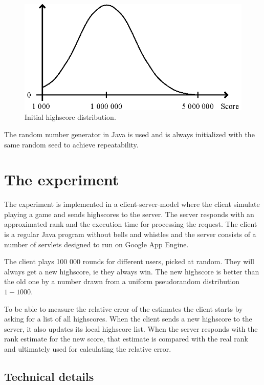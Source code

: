 \begin{figure}[h]
  \centering
  \caption{Initial highscore distribution.}
  \label{fig:highscore-distribution}
  \includegraphics[width=13cm]{img/highscore-distribution.eps}
\end{figure} 

The random number generator in Java is used and is always initialized with the same random seed to achieve repeatability.  

\section{The experiment}

The experiment is implemented in a client-server-model where the client simulate playing a game and sends highscores to the server. The server responds with an approximated rank and the execution time for processing the request. The client is a regular Java program without bells and whistles and the server consists of a number of servlets designed to run on Google App Engine.

The client plays 100 000 rounds for different users, picked at random. They will always get a new highscore, ie they always win. The new highscore is better than the old one by a number drawn from a uniform pseudorandom distribution $1-1000$.

To be able to measure the relative error of the estimates the client starts by asking for a list of all highscores. When the client sends a new highscore to the server, it also updates its local highscore list. When the server responds with the rank estimate for the new score, that estimate is compared with the real rank and ultimately used for calculating the relative error.

\subsection*{Technical details}


